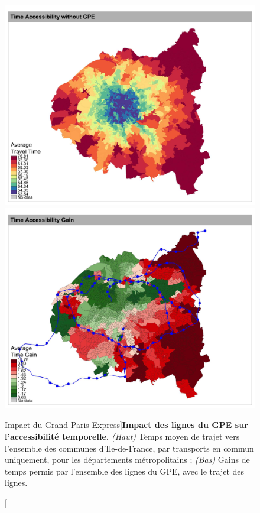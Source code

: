 \begin{figure}
	\includegraphics[width=0.8\linewidth]{Figures/CaseStudies/timeaccess_metropole}\\
	\includegraphics[width=0.8\linewidth]{Figures/CaseStudies/timegain_metropole}
	\caption[Impact of \emph{Grand Paris Express}][Impact du Grand Paris Express]{\label{fig:casestudies:gpe}}{\textbf{Impact des lignes du GPE sur l'accessibilité temporelle.} \textit{(Haut)} Temps moyen de trajet vers l'ensemble des communes d'Ile-de-France, par transports en commun uniquement, pour les départements métropolitains ; \textit{(Bas)} Gains de temps permis par l'ensemble des lignes du GPE, avec le trajet des lignes.\label{fig:casestudies:gpe}}
\end{figure}






